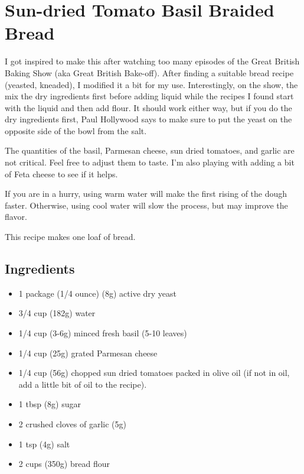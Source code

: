 \documentclass[10pt, openany]{book}
\begin{document}
\section{Sun-dried Tomato Basil Braided Bread}
\label{bread:SundriedTomatoBasil}
I got inspired to make this after watching too many episodes of the Great British Baking Show (aka Great British Bake-off).  After finding a suitable bread recipe (yeasted, kneaded), I modified it a bit for my use.  Interestingly, on the show, the mix the dry ingredients first before adding liquid while the recipes I found start with the liquid and then add flour.  It should work either way, but if you do the dry ingredients first, Paul Hollywood says to make sure to put the yeast on the opposite side of the bowl from the salt.

The quantities of the basil, Parmesan cheese, sun dried tomatoes, and garlic are not critical.  Feel free to adjust them to taste.  I'm also playing with adding a bit of Feta cheese to see if it helps.

If you are in a hurry, using warm water will make the first rising of the dough faster.  Otherwise, using cool water will slow the process, but may improve the flavor.

This recipe makes one loaf of bread.

\subsection{Ingredients}
\begin{itemize}
  \item 1 package (1/4 ounce) (8g) active dry yeast
  \item 3/4 cup (182g) water
  \item 1/4 cup (3-6g) minced fresh basil (5-10 leaves)
  \item 1/4 cup (25g) grated Parmesan cheese
  \item 1/4 cup (56g) chopped sun dried tomatoes packed in olive oil (if not in oil, add a little bit of oil to the recipe).
  \item 1 tbsp (8g) sugar
  \item 2 crushed cloves of garlic (5g)
  \item 1 tsp (4g) salt
  \item 2 cups (350g) bread flour
\end{itemize}
\end{document}
